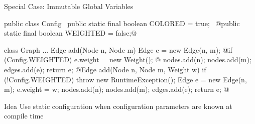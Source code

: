 \begin{frame}[fragile]{Special Case: Immutable Global Variables}
	\begin{fancycolumns}[widths={56}]
		\small
\begin{codetight}{}
public class Config {
	~public static final boolean COLORED = true;~
	@public static final boolean WEIGHTED = false;@
}
\end{codetight}
\begin{codetight}{}
class Graph {
	...
	Edge add(Node n, Node m) {
		Edge e = new Edge(n, m);
		@if (Config.WEIGHTED) { e.weight = new Weight(); }@
		nodes.add(n); nodes.add(m); edges.add(e);
		return e;
	}
	@Edge add(Node n, Node m, Weight w) {
		if (!Config.WEIGHTED) { throw new RuntimeException(); }
		Edge e = new Edge(n, m);
		e.weight = w;
		nodes.add(n); nodes.add(m); edges.add(e);
		return e;
	}@
}
\end{codetight}
	\nextcolumn
		\begin{definition}{Idea}
			Use static configuration when configuration parameters are known at compile time
		\end{definition}
	\end{fancycolumns}
\end{frame}


